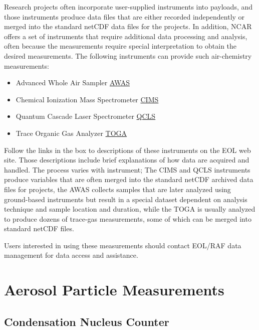 \documentclass[
]{book}
\begin{document}
Research projects often incorporate user-supplied instruments into payloads, and those instruments produce data files that are either recorded independently or merged into the standard netCDF data files for the projects. In addition, NCAR offers a set of instruments that require additional data processing and analysis, often because the measurements require special interpretation to obtain the desired measurements. The following instruments can provide such air-chemistry measurements:

\begin{itemize}
\item
  \setlength{\itemsep}{-1\parsep}Advanced Whole Air Sampler \href{http://www.eol.ucar.edu/instruments/advanced-whole-air-sampler}{AWAS}
\item
  Chemical Ionization Mass Spectrometer \href{http://www.eol.ucar.edu/instruments/georgia-tech-chemical-ionization-mass-spectrometer}{CIMS}
\item
  Quantum Cascade Laser Spectrometer \href{http://www.eol.ucar.edu/instruments/quantum-cascade-laser-spectrometer}{QCLS}
\item
  Trace Organic Gas Analyzer \href{http://www.eol.ucar.edu/instruments/trace-organic-gas-analyzer}{TOGA}
\end{itemize}

Follow the links in the box to descriptions of these instruments on the EOL web site. Those descriptions include brief explanations of how data are acquired and handled. The process varies with instrument; The CIMS and QCLS instruments produce variables that are often merged into the standard netCDF archived data files for projects, the AWAS collects samples that are later analyzed using ground-based instruments but result in a special dataset dependent on analysis technique and sample location and duration, while the TOGA is usually analyzed to produce dozens of trace-gas measurements, some of which can be merged into standard netCDF files.

Users interested in using these measurements should contact EOL/RAF data management for data access and assistance.

\hypertarget{aerosol-particle-measurements}{%
\chapter{Aerosol Particle Measurements}\label{aerosol-particle-measurements}}

\hypertarget{condensation-nucleus-counter}{%
\section{Condensation Nucleus Counter}\label{condensation-nucleus-counter}}
\end{document}
